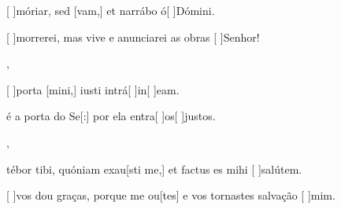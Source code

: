 {  %
  {\item {}[ ]{mó}riar, sed [vam,] et narrábo ó[ ]{Dó}mini.}%
    {\item {}[ ]{mor}rerei, mas vive e anunciarei as obras [ ]{Se}{\-nhor}!},
  {\item {}[ ]{por}ta [mini,] iusti intrá[ ]{in}[ ]{e}am.}%
    {\item {} é a porta do Se[:] por ela entra[ ]{os}[ ]{jus}tos.},
  {\item {}tébor tibi, quóniam exau[sti me,] et factus es mihi [ ]{sa}{lú}tem.}%
    {\item {}[ ]{vos} dou graças, porque me ou[tes] e vos tornastes salvação [ ]{mim}.}
}